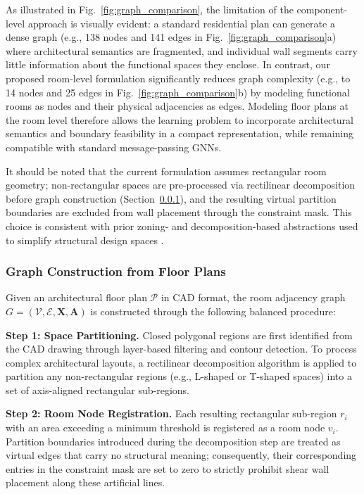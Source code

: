 As illustrated in Fig.~\ref{fig:graph_comparison}, the limitation of the component-level approach is visually evident: a standard residential plan can generate a dense graph (e.g., 138 nodes and 141 edges in Fig.~\ref{fig:graph_comparison}a) where architectural semantics are fragmented, and individual wall segments carry little information about the functional spaces they enclose. In contrast, our proposed room-level formulation significantly reduces graph complexity (e.g., to 14 nodes and 25 edges in Fig.~\ref{fig:graph_comparison}b) by modeling functional rooms as nodes and their physical adjacencies as edges. Modeling floor plans at the room level therefore allows the learning problem to incorporate architectural semantics and boundary feasibility in a compact representation, while remaining compatible with standard message-passing GNNs.

It should be noted that the current formulation assumes rectangular room geometry; non-rectangular spaces are pre-processed via rectilinear decomposition before graph construction (Section~\ref{subsubsec:graph_construction}), and the resulting virtual partition boundaries are excluded from wall placement through the constraint mask. This choice is consistent with prior zoning- and decomposition-based abstractions used to simplify structural design spaces \cite{Claessens_2020,Liu_2021}.


\subsubsection{Graph Construction from Floor Plans}
\label{subsubsec:graph_construction}

Given an architectural floor plan $\mathcal{P}$ in CAD format, the room adjacency graph $G = (\mathcal{V}, \mathcal{E}, \mathbf{X}, \mathbf{A})$ is constructed through the following balanced procedure:

\textbf{Step 1: Space Partitioning.} Closed polygonal regions are first identified from the CAD drawing through layer-based filtering and contour detection. To process complex architectural layouts, a rectilinear decomposition algorithm is applied to partition any non-rectangular regions (e.g., L-shaped or T-shaped spaces) into a set of axis-aligned rectangular sub-regions.

\textbf{Step 2: Room Node Registration.} Each resulting rectangular sub-region $r_i$ with an area exceeding a minimum threshold is registered as a room node $v_i$. Partition boundaries introduced during the decomposition step are treated as virtual edges that carry no structural meaning; consequently, their corresponding entries in the constraint mask are set to zero to strictly prohibit shear wall placement along these artificial lines.

